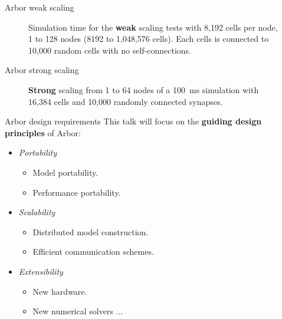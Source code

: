 \documentclass[aspectratio=43]{beamer}
\newcommand{\arbor}{{\ttfamily Arbor}\xspace}
\begin{document}
\begin{frame}[fragile]{\arbor weak scaling}
    \begin{figure}[htp!]
       \begin{center}
           
           \caption{
               Simulation time for the \textbf{weak} scaling tests with 8,192 cells per node, 1 to 128 nodes (8192 to 1,048,576 cells).
               Each cells is connected to 10,000 random cells with no self-connections.
           }
           \label{fig:weak_tts}
       \end{center}
    \end{figure}
\end{frame}

\begin{frame}[fragile]{\arbor strong scaling}
    \begin{figure}[htp!]
        \centering
        
        
        \caption{
            \textbf{Strong} scaling from 1 to 64 nodes of a 100~ms simulation with 16,384 cells and 10,000 randomly connected synapses.
        }
        \label{fig:strong_multi}
    \end{figure}
\end{frame}

\begin{frame}[fragile]{\arbor design requirements}
    This talk will focus on the \textbf{guiding design principles} of \arbor:
    \begin{itemize}
        \item \emph{Portability}
        \begin{itemize}
            \item Model portability.
            \item Performance portability.
        \end{itemize}
        \item \emph{Scalability}
        \begin{itemize}
            \item Distributed model construction.
            \item Efficient communication schemes. 
        \end{itemize}
        \item \emph{Extensibility}
        \begin{itemize}
            \item New hardware. 
            \item New numerical solvers ... 
        \end{itemize}
    \end{itemize}
\end{frame}
\end{document}
